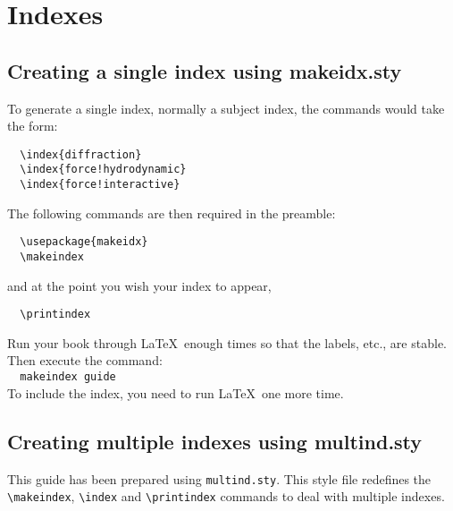 
\chapter{Indexes}
\label{indexes}

\section{Creating a single index using makeidx.sty}
To generate a single index, normally a subject index, the commands would take the form:
\begin{verbatim}
  \index{diffraction}
  \index{force!hydrodynamic}
  \index{force!interactive}
\end{verbatim}
The following commands are then required in the preamble:
\begin{verbatim}
  \usepackage{makeidx}
  \makeindex
\end{verbatim}
and at the point you wish your index to appear,
\begin{verbatim}
  \printindex
\end{verbatim}
Run your book through \LaTeX\ enough times so that the labels, etc., are stable. Then execute the command:\\[0.5\baselineskip]
\verb"  makeindex "\texttt{\cambridge guide}\\[0.5\baselineskip]
To include the index, you need to run \LaTeX\ one more time.


\section{Creating multiple indexes using multind.sty}
This guide has been prepared using \verb"multind.sty". This style file redefines the \verb"\makeindex", \verb"\index" and \verb"\printindex" commands to deal with multiple indexes.

